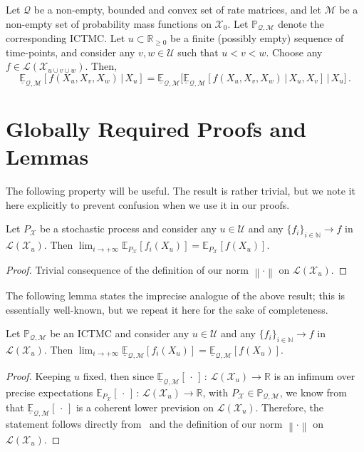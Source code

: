 \documentclass[twoside,11pt]{article}
\newcommand{\nats}{\mathbb{N}}
\newcommand{\reals}{\mathbb{R}}
\newcommand{\realsnonneg}{\reals_{\geq 0}}
\newcommand{\states}{\mathcal{X}}
\newcommand{\lexp}{\underline{\mathbb{E}}_{\rateset,\mathcal{M}}}
\newcommand{\gambles}{\mathcal{L}}
\newcommand{\rateset}{\mathcal{Q}}
\newcommand{\norm}[1]{\left\lVert #1 \right\rVert}
\begin{document}
\begin{lemma}\cite[Theorem 6.5]{krak2016ictmc}\label{lemma:iterated_lower}
Let $\rateset$ be a non-empty, bounded and convex set of rate matrices, and let $\mathcal{M}$ be a non-empty set of probability mass functions on $\states_0$. Let $\mathbb{P}_{\rateset,\mathcal{M}}$ denote the corresponding ICTMC.
Let $u\subset\realsnonneg$ be a finite (possibly empty) sequence of time-points, and consider any $v,w\in\mathcal{U}$ such that $u<v<w$. Choose any $f\in\gambles(\states_{u\cup v\cup w})$. Then,
\begin{equation*}
\lexp[f(X_u,X_v,X_w)\,\vert\,X_u] = \lexp\bigl[\lexp[f(X_u,X_v,X_w)\,\vert\,X_u,X_v]\,\vert\,X_u\bigr]\,.
\end{equation*}
\end{lemma}

\section{Globally Required Proofs and Lemmas}

The following property will be useful. The result is rather trivial, but we note it here explicitly to prevent confusion when we use it in our proofs.
\begin{lemma}\label{lemma:limit_exp_is_exp_limit}
Let $P_\states$ be a stochastic process and consider any $u\in\mathcal{U}$ and any $\{f_i\}_{i\in\nats}\to f$ in $\gambles(\states_u)$. Then $\lim_{i\to+\infty}\mathbb{E}_{P_\states}[f_i(X_u)]=\mathbb{E}_{P_\states}[f(X_u)]$.
\end{lemma}
\begin{proof}
Trivial consequence of the definition of our norm $\norm{\cdot}$ on $\gambles(\states_u)$.
\end{proof}

The following lemma states the imprecise analogue of the above result; this is essentially well-known, but we repeat it here for the sake of completeness.

\begin{lemma}\label{lemma:limit_lexp_is_lexp_limit}
Let $\mathbb{P}_{\rateset,\mathcal{M}}$ be an ICTMC and consider any $u\in\mathcal{U}$ and any $\{f_i\}_{i\in\nats}\to f$ in $\gambles(\states_u)$. Then $\lim_{i\to+\infty}\lexp[f_i(X_u)]=\lexp[f(X_u)]$.
\end{lemma}
\begin{proof}
Keeping $u$ fixed, then since $\lexp[\,\cdot\,]\,:\,\gambles(\states_u)\to\reals$ is an infimum over precise expectations $\mathbb{E}_{P_\states}[\,\cdot\,]\,:\,\gambles(\states_u)\to\reals$, with $P_\states\in\mathbb{P}_{\rateset,\mathcal{M}}$, we know from~\cite[Theorem 3.3.3]{Walley:1991vk} that $\lexp[\,\cdot\,]$ is a coherent lower prevision on $\gambles(\states_u)$. Therefore, the statement follows directly from~\cite[Proposition 2.6.1.$\ell$]{Walley:1991vk} and the definition of our norm $\norm{\cdot}$ on $\gambles(\states_u)$.
\end{proof}
\end{document}
